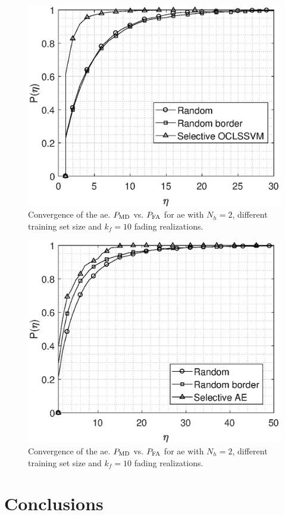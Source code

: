 \documentclass[draftcls,onecolumn,12pt]{IEEEtran}
\begin{document}
\begin{figure}[t]
    \centering
    \includegraphics[width=0.6\columnwidth]{res_selective_SVM.eps}
    \caption{Convergence of the \ac{ae}. $P_{\rm MD}$ vs. $P_{\rm FA}$ for \ac{ae} with $N_h = 2$, different training set size and $k_f=10$ fading realizations.}
    \label{fig:selectiveSVM}
\end{figure}

\begin{figure}[t]
    \centering
    \includegraphics[width=0.6\columnwidth]{res_selective_AE.eps}
    \caption{Convergence of the \ac{ae}. $P_{\rm MD}$ vs. $P_{\rm FA}$ for \ac{ae} with $N_h = 2$, different training set size and $k_f=10$ fading realizations.}
    \label{fig:selectiveAE}
\end{figure}

\section{Conclusions}
\end{document}

